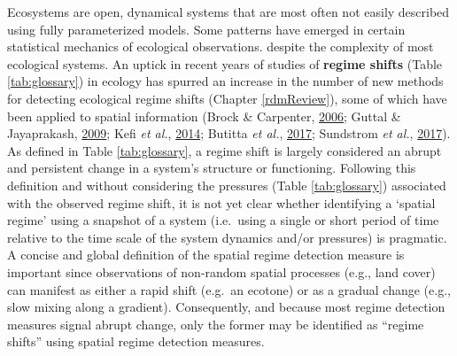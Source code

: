 \documentclass[12pt,twoside,openany]{reedthesis}
\begin{document}
Ecosystems are open, dynamical systems that are most often not easily described using fully parameterized models. Some patterns have emerged in certain statistical mechanics of ecological observations. despite the complexity of most ecological systems. An uptick in recent years of studies of \textbf{regime shifts} (Table \ref{tab:glossary}) in ecology has spurred an increase in the number of new methods for detecting ecological regime shifts (Chapter \ref{rdmReview}), some of which have been applied to spatial information (Brock \& Carpenter, \protect\hyperlink{ref-brock_variance_2006}{2006}; Guttal \& Jayaprakash, \protect\hyperlink{ref-guttal2009spatial}{2009}; Kefi \emph{et al.}, \protect\hyperlink{ref-kefi2014early}{2014}; Butitta \emph{et al.}, \protect\hyperlink{ref-butitta_spatial_2017}{2017}; Sundstrom \emph{et al.}, \protect\hyperlink{ref-sundstrom2017detecting}{2017}). As defined in Table \ref{tab:glossary}, a regime shift is largely considered an abrupt and persistent change in a system's structure or functioning. Following this definition and without considering the pressures (Table \ref{tab:glossary}) associated with the observed regime shift, it is not yet clear whether identifying a `spatial regime' using a snapshot of a system (i.e.~using a single or short period of time relative to the time scale of the system dynamics and/or pressures) is pragmatic. A concise and global definition of the spatial regime detection measure is important since observations of non-random spatial processes (e.g., land cover) can manifest as either a rapid shift (e.g.~an ecotone) or as a gradual change (e.g., slow mixing along a gradient). Consequently, and because most regime detection measures signal abrupt change, only the former may be identified as ``regime shifts'' using spatial regime detection measures.
\end{document}
